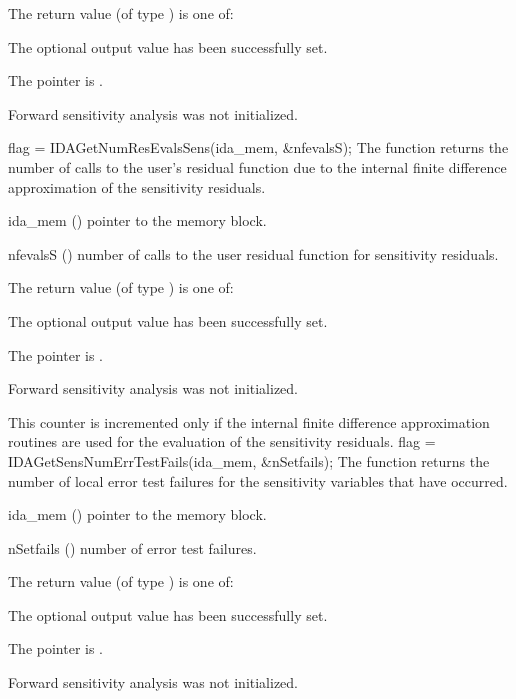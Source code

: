 {
  The return value  (of type ) is one of:
  \begin{args}
  \item[\Id{IDA\_SUCCESS}] 
    The optional output value has been successfully set.
  \item[\Id{IDA\_MEM\_NULL}]
    The  pointer is .
  \item[\Id{IDA\_NO\_SENS}]
    Forward sensitivity analysis was not initialized.
  \end{args}
}
{}
{
  flag = IDAGetNumResEvalsSens(ida\_mem, \&nfevalsS);
}
{
  The function  returns the number of calls to the
  user's residual function due to the internal finite difference approximation
  of the sensitivity residuals.
}
{
  \begin{args}
  \item[ida\_mem] ()
    pointer to the {\idas} memory block.
  \item[nfevalsS] ()
    number of calls to the user residual function for sensitivity residuals.
  \end{args}
}
{
  The return value  (of type ) is one of:
  \begin{args}
  \item[\Id{IDA\_SUCCESS}] 
    The optional output value has been successfully set.
  \item[\Id{IDA\_MEM\_NULL}]
    The  pointer is .
  \item[\Id{IDA\_NO\_SENS}]
    Forward sensitivity analysis was not initialized.
  \end{args}
}
{
  This counter is incremented only if the internal finite difference approximation
  routines are used for the evaluation of the sensitivity residuals.
}
{
  flag = IDAGetSensNumErrTestFails(ida\_mem, \&nSetfails);
}
{
  The function  returns the number of local
  error test failures for the sensitivity variables that have occurred.
}
{
  \begin{args}
  \item[ida\_mem] ()
    pointer to the {\idas} memory block.
  \item[nSetfails] ()
    number of error test failures.
  \end{args}
}
{
  The return value  (of type ) is one of:
  \begin{args}
  \item[\Id{IDA\_SUCCESS}] 
    The optional output value has been successfully set.
  \item[\Id{IDA\_MEM\_NULL}]
    The  pointer is .
  \item[\Id{IDA\_NO\_SENS}]
    Forward sensitivity analysis was not initialized.
  \end{args}
}
